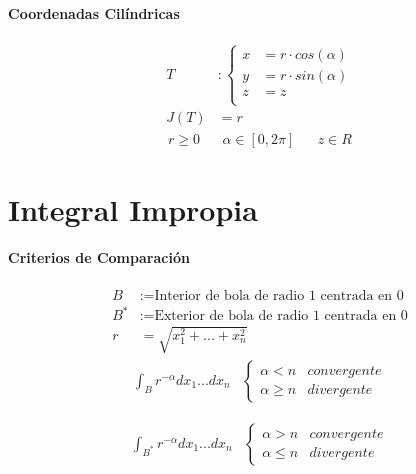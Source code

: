 \documentclass[a4paper]{article}
\begin{document}
\begin{multicols}{2}
      \paragraph{Coordenadas Cilíndricas}

        \begin{align*}
          T &:
          \begin{cases}
            x &= r \cdot cos(\alpha)\\
            y &= r \cdot sin(\alpha)\\
            z &= z \\
          \end{cases} \\
          J(T) &= r
        \end{align*}
        \begin{align*}
          r \geq 0 &&  \alpha \in[0,2\pi] && z \in R
        \end{align*}


    \section{Integral Impropia}

      \paragraph{Criterios de Comparación}
        \begin{align*}
          B &:= \text{Interior de bola de radio 1 centrada en 0} \\
          B^* &:= \text{Exterior de bola de radio 1 centrada en 0} \\
          r &= \sqrt{x_1^2 + ... + x_n^2}
        \end{align*}
        \begin{align*}
          \int_B r^{-\alpha} dx_1...dx_n &
          \begin{cases}
            \alpha < n & convergente\\
            \alpha \geq n & divergente
          \end{cases}
        \end{align*}

        \begin{align*}
          \int_{B^*}r^{-\alpha} dx_1...dx_n &
          \begin{cases}
            \alpha > n & convergente\\
            \alpha \leq n & divergente
          \end{cases}
        \end{align*}



\end{multicols}
\end{document}
